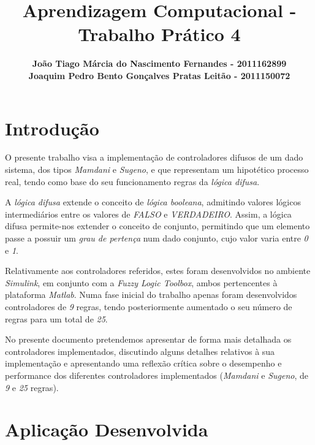 \documentclass{article}
\title{\bf{Aprendizagem Computacional - Trabalho Prático 4}\vspace{80mm}}
\author{\textbf{João Tiago Márcia do Nascimento Fernandes - 2011162899} \\
\textbf{Joaquim Pedro Bento Gonçalves Pratas Leitão - 2011150072}}
\begin{document}
\maketitle

\pagebreak

\renewcommand*\contentsname{Índice}
\tableofcontents

\pagebreak

\section{Introdução}

O presente trabalho visa a implementação de controladores difusos de um dado sistema, dos tipos \emph{Mamdani} e \emph{Sugeno}, e que representam um hipotético processo real, tendo como base do seu funcionamento regras da \emph{lógica difusa}.

A \emph{lógica difusa} extende o conceito de \emph{lógica booleana}, admitindo valores lógicos intermediários entre os valores de \emph{FALSO} e \emph{VERDADEIRO}. Assim, a lógica difusa permite-nos extender o conceito de conjunto, permitindo que um elemento passe a possuir um \emph{grau de pertença} num dado conjunto, cujo valor varia entre \emph{0} e \emph{1}.

Relativamente aos controladores referidos, estes foram desenvolvidos no ambiente \emph{Simulink}, em conjunto com a \emph{Fuzzy Logic Toolbox}, ambos pertencentes à plataforma \emph{Matlab}. Numa fase inicial do trabalho apenas foram desenvolvidos controladores de \emph{9} regras, tendo posteriormente aumentado o seu número de regras para um total de \emph{25}.

No presente documento pretendemos apresentar de forma mais detalhada os controladores implementados, discutindo alguns detalhes relativos à sua implementação e apresentando uma reflexão crítica sobre o desempenho e performance dos diferentes controladores implementados (\emph{Mamdani} e \emph{Sugeno}, de \emph{9} e \emph{25} regras).


\pagebreak

\section{Aplicação Desenvolvida}

\end{document}
